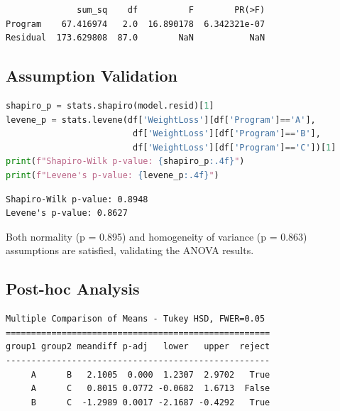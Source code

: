 \documentclass[12pt, a4paper]{article}
\begin{document}
\begin{outputbox}
\begin{verbatim}
              sum_sq    df          F        PR(>F)
Program    67.416974   2.0  16.890178  6.342321e-07
Residual  173.629808  87.0        NaN           NaN
\end{verbatim}
\end{outputbox}

\subsection*{Assumption Validation}

\begin{lstlisting}[language=Python]
shapiro_p = stats.shapiro(model.resid)[1]
levene_p = stats.levene(df['WeightLoss'][df['Program']=='A'],
                         df['WeightLoss'][df['Program']=='B'],
                         df['WeightLoss'][df['Program']=='C'])[1]
print(f"Shapiro-Wilk p-value: {shapiro_p:.4f}")
print(f"Levene's p-value: {levene_p:.4f}")
\end{lstlisting}

\begin{outputbox}
\begin{verbatim}
Shapiro-Wilk p-value: 0.8948
Levene's p-value: 0.8627
\end{verbatim}
\end{outputbox}

\begin{insightbox}
Both normality (p = 0.895) and homogeneity of variance (p = 0.863) assumptions are satisfied, validating the ANOVA results.
\end{insightbox}

\subsection*{Post-hoc Analysis}

\begin{outputbox}
\begin{verbatim}
Multiple Comparison of Means - Tukey HSD, FWER=0.05
====================================================
group1 group2 meandiff p-adj   lower   upper  reject
----------------------------------------------------
     A      B   2.1005  0.000  1.2307  2.9702   True
     A      C   0.8015 0.0772 -0.0682  1.6713  False
     B      C  -1.2989 0.0017 -2.1687 -0.4292   True
\end{verbatim}
\end{outputbox}
\end{document}
